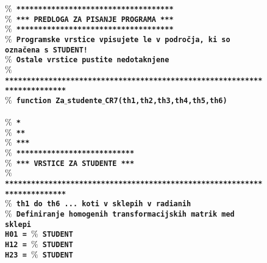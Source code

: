 \begin{figure}[h]
\scriptsize%
\textcolor[rgb]{0.13,0.55,0.13}{\textbf{\texttt{$\%$ ************************************}}}\\ %
\textcolor[rgb]{0.13,0.55,0.13}{\textbf{\texttt{$\%$ *** PREDLOGA ZA PISANJE PROGRAMA ***}}}\\ %
\textcolor[rgb]{0.13,0.55,0.13}{\textbf{\texttt{$\%$ ************************************}}}\\ %
\textcolor[rgb]{0.13,0.55,0.13}{\textbf{\texttt{$\%$ Programske vrstice vpisujete le v področja, ki so označena s STUDENT!}}}\\ %
\textcolor[rgb]{0.13,0.55,0.13}{\textbf{\texttt{$\%$ Ostale vrstice pustite nedotaknjene}}}\\ %
\textcolor[rgb]{0.13,0.55,0.13}{\textbf{\texttt{$\%$ *************************************************************************}}}\\ %
\textcolor[rgb]{0.00,0.00,0.00}{\textbf{\texttt{$\%$ function Za$\_$studente$\_$CR7(th1,th2,th3,th4,th5,th6)}}}\\ %
\\ %
\textcolor[rgb]{0.13,0.55,0.13}{\textbf{\texttt{$\%$ *}}}\\ %
\textcolor[rgb]{0.13,0.55,0.13}{\textbf{\texttt{$\%$ **}}}\\ %
\textcolor[rgb]{0.13,0.55,0.13}{\textbf{\texttt{$\%$ ***}}}\\ %
\textcolor[rgb]{0.13,0.55,0.13}{\textbf{\texttt{$\%$ ***************************}}}\\ %
\textcolor[rgb]{0.13,0.55,0.13}{\textbf{\texttt{$\%$ *** VRSTICE ZA STUDENTE ***}}}\\ %
\textcolor[rgb]{0.13,0.55,0.13}{\textbf{\texttt{$\%$ *************************************************************************}}}\\ %
\textcolor[rgb]{0.13,0.55,0.13}{\textbf{\texttt{$\%$ th1 do th6 ... koti v sklepih v radianih}}}\\ %
\textcolor[rgb]{0.13,0.55,0.13}{\textbf{\texttt{$\%$ Definiranje homogenih transformacijskih matrik med sklepi}}}\\ %
\textbf{\texttt{\hspace*{1cm}H01 = \textcolor[rgb]{0.13,0.55,0.13}{$\%$ STUDENT}}}\\ %
\textbf{\texttt{\hspace*{1cm}H12 = \textcolor[rgb]{0.13,0.55,0.13}{$\%$ STUDENT}}}\\ %
\textbf{\texttt{\hspace*{1cm}H23 = \textcolor[rgb]{0.13,0.55,0.13}{$\%$ STUDENT}}}\\ %

\end{figure}
